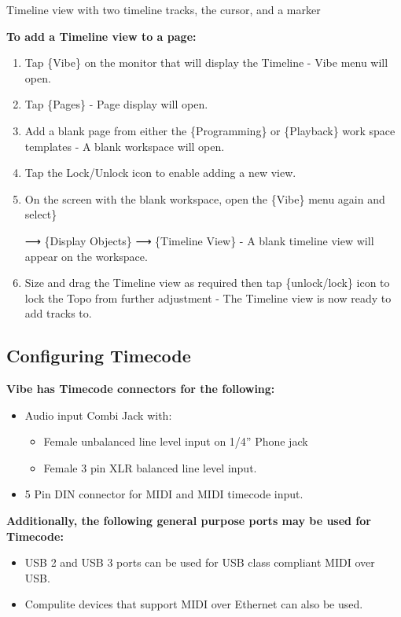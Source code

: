 \documentclass[
]{article}
\begin{document}
Timeline view with two timeline tracks, the cursor, and a marker

\textbf{To add a Timeline view to a page:}

\begin{enumerate}
\def\labelenumi{\arabic{enumi}.}
\item
  Tap \{Vibe\} on the monitor that will display the Timeline - Vibe menu will open.
\item
  Tap \{Pages\} - Page display will open.
\item
  Add a blank page from either the \{Programming\} or \{Playback\} work space templates - A blank workspace will open.
\item
  Tap the Lock/Unlock icon to enable adding a new view.
\item
  On the screen with the blank workspace, open the \{Vibe\} menu again and select\}

  ⟶ \{Display Objects\}
  ⟶ \{Timeline View\} - A blank timeline view will appear on the workspace.
\item
  Size and drag the Timeline view as required then tap \{unlock/lock\} icon to lock the Topo from further adjustment - The Timeline view is now ready to add tracks to.
\end{enumerate}

\hypertarget{configuring-timecode}{%
\subsection{Configuring Timecode}\label{configuring-timecode}}

\textbf{Vibe has Timecode connectors for the following:}

\begin{itemize}
\item
  Audio input Combi Jack with:

  \begin{itemize}
  \item
    Female unbalanced line level input on 1/4'' Phone jack
  \item
    Female 3 pin XLR balanced line level input.
  \end{itemize}
\item
  5 Pin DIN connector for MIDI and MIDI timecode input.
\end{itemize}

\textbf{Additionally, the following general purpose ports may be used for Timecode:}

\begin{itemize}
\item
  USB 2 and USB 3 ports can be used for USB class compliant MIDI over USB.
\item
  Compulite devices that support MIDI over Ethernet can also be used.
\end{itemize}
\end{document}
